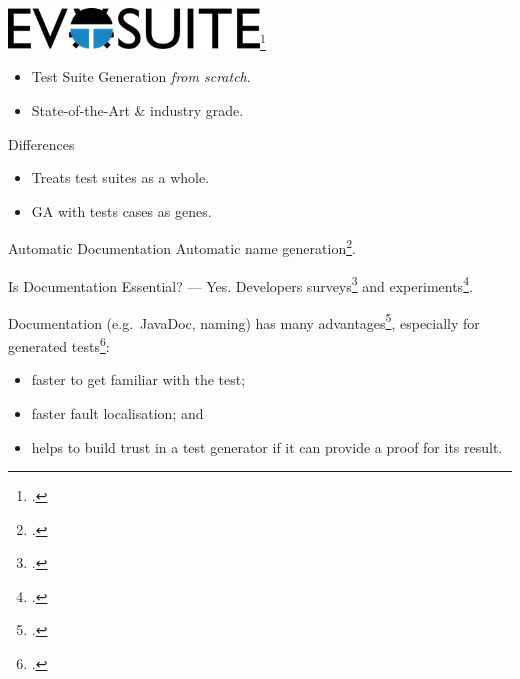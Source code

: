\documentclass[aspectratio=169,dvipsnames]{beamer}
\begin{document}
\begin{frame}[standout]

\end{frame}

\begin{frame}
  \begin{center}
      \includegraphics[width=0.5\textwidth]{evosuite-logo}\footcite{fraser2011evosuite}
  \end{center}
  \begin{itemize}
    \item Test Suite Generation \emph{from scratch}.
    \item State-of-the-Art \& industry grade.
  \end{itemize}

  \vfill

  \begin{block}{Differences}
    \begin{itemize}
      \item Treats test suites as a whole.
      \item GA with tests cases as genes.
    \end{itemize}
  \end{block}

  \begin{block}{Automatic Documentation}
    Automatic name generation\footcite{daka2017generating}.
  \end{block}
\end{frame}

\begin{frame}{Is Documentation Essential? --- Yes.}
  Developers surveys\footcite{daka2014survey,prado2015wap,prado2016advances,prado2018towards,li2016automatically} and experiments\footcite{panichella2016impact}.

  Documentation (e.g.\ JavaDoc, naming) has many advantages\footcite{daka2017generating}, especially for generated tests\footcite{rojas2017search,shamshiri2018how}:
  \begin{itemize}
    \item faster to get familiar with the test;
    \item faster fault localisation; and
    \item helps to build trust in a test generator if it can provide a proof for its result.
  \end{itemize}
\end{frame}
\end{document}
